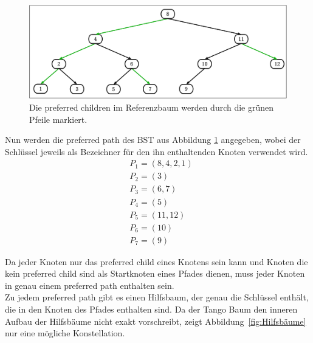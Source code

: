 \documentclass[a4paper,12pt]{article}
\begin{document}
\begin{figure}[H]
	\centering
	\includegraphics[width=1\textwidth]{Medien/Tango/prefChilds}
	\caption{Die preferred children im Referenzbaum werden durch die grünen Pfeile markiert. }
	\label{fig:prefChilds}
\end{figure}

\noindent Nun werden die preferred path des BST aus Abbildung \ref{fig:prefChilds} angegeben, wobei der Schlüssel jeweils als Bezeichner für den ihn enthaltenden Knoten verwendet wird.
\begin{align*}
&P_1 =  \left( 8, 4, 2,1 \right) \\
&P_2 = \left(3 \right)\\
&P_3 = \left(6, 7 \right)\\
&P_4 = \left(5 \right)\\
&P_5 = \left(11, 12 \right) \\
&P_6 = \left(10 \right)\\
&P_7 = \left(9\right)
\end{align*}

\noindent Da jeder Knoten nur das preferred child eines Knotens sein kann und Knoten die kein preferred child sind als Startknoten eines Pfades dienen, muss jeder Knoten in genau einem preferred path enthalten sein.\\
Zu jedem preferred path gibt es einen Hilfsbaum, der genau die Schlüssel enthält, die in den Knoten des Pfades enthalten sind. Da der Tango Baum den inneren Aufbau der Hilfsbäume nicht exakt vorschreibt, zeigt \mbox{Abbildung \ref{fig:Hilfsbäume}} nur eine mögliche Konstellation.
\end{document}
